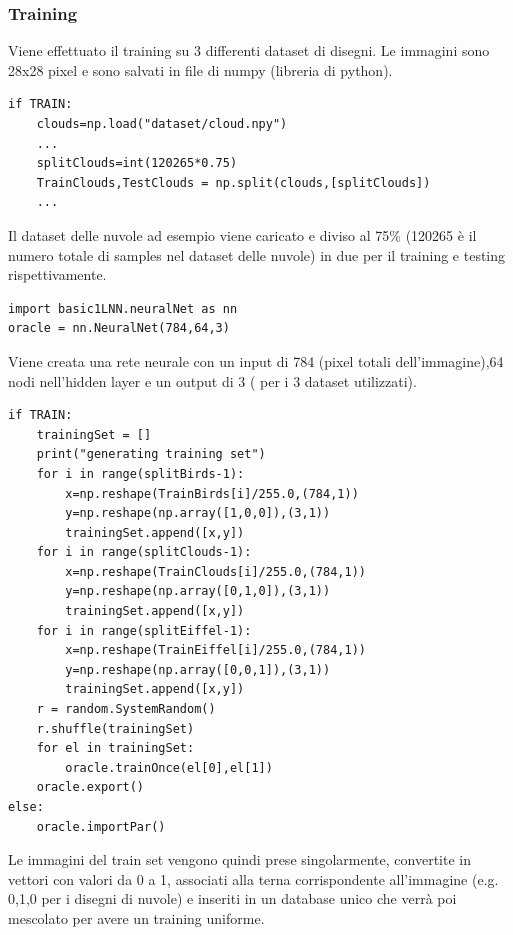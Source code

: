 \documentclass[12pt]{article}
\begin{document}
\subsubsection{Training}
Viene effettuato il training su 3 differenti dataset di disegni. Le immagini sono 28x28 pixel e sono salvati in file di numpy (libreria di python).
\begin{lstlisting}[language=myPython]
if TRAIN:
	clouds=np.load("dataset/cloud.npy")
	...
	splitClouds=int(120265*0.75)
	TrainClouds,TestClouds = np.split(clouds,[splitClouds])
	...
\end{lstlisting}
Il dataset delle nuvole ad esempio viene caricato e diviso al 75\% (120265 è il numero totale di samples nel dataset delle nuvole) in due per il training e testing rispettivamente.
\begin{lstlisting}[language=myPython]
import basic1LNN.neuralNet as nn
oracle = nn.NeuralNet(784,64,3)
\end{lstlisting}
Viene creata una rete neurale con un input di 784 (pixel totali dell'immagine),64 nodi nell'hidden layer e un output di 3 ( per i 3 dataset utilizzati).
\newpage
\begin{lstlisting}[language=myPython]
if TRAIN:
	trainingSet = []
	print("generating training set")
	for i in range(splitBirds-1):
		x=np.reshape(TrainBirds[i]/255.0,(784,1))
		y=np.reshape(np.array([1,0,0]),(3,1))
		trainingSet.append([x,y])
	for i in range(splitClouds-1):
		x=np.reshape(TrainClouds[i]/255.0,(784,1))
		y=np.reshape(np.array([0,1,0]),(3,1))
		trainingSet.append([x,y])
	for i in range(splitEiffel-1):
		x=np.reshape(TrainEiffel[i]/255.0,(784,1))
		y=np.reshape(np.array([0,0,1]),(3,1))
		trainingSet.append([x,y])
	r = random.SystemRandom()
	r.shuffle(trainingSet)
	for el in trainingSet:
		oracle.trainOnce(el[0],el[1])
	oracle.export()
else:
	oracle.importPar()
\end{lstlisting}
Le immagini del train set vengono quindi prese singolarmente, convertite in vettori con valori da 0 a 1, associati alla terna corrispondente all'immagine (e.g. 0,1,0 per i disegni di nuvole) e inseriti in un database unico che verrà poi mescolato per avere un training uniforme.
\newpage
\end{document}
